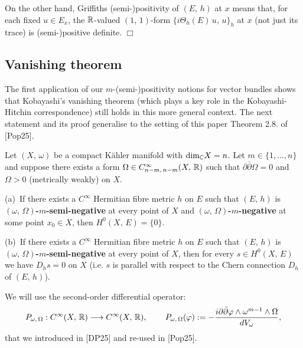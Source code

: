 \documentclass[12pt]{article}
\begin{document}
On the other hand, Griffiths (semi-)positivity of $(E,\,h)$ at $x$ means that, for each fixed $u\in E_x$, the $\mathbb{R}$-valued $(1,\,1)$-form $\{i\Theta_h(E)\,u,\,u\}_h$ at $x$ (not just its trace) is (semi-)positive definite.  \hfill $\Box$


\subsection{Vanishing theorem}\label{subsection:vanishing}

The first application of our $m$-(semi-)positivity notions for vector bundles shows that Kobayashi's vanishing theorem (which plays a key role in the Kobayashi-Hitchin correspondence) still holds in this more general context. The next statement and its proof generalise to the setting of this paper Theorem 2.8. of [Pop25].


\begin{The}\label{The:Kobayashi-vanishing_gen} Let $(X,\,\omega)$ be a compact K\"ahler manifold with $\mbox{dim}_{\mathbb{C}} X =n$. Let $m\in\{1,\dots , n\}$ and suppose there exists a form $\Omega\in C^\infty_{n-m,\,n-m}(X,\,\mathbb{R})$ such that $\partial\bar\partial\Omega = 0$ and $\Omega>0$ (metrically weakly) on $X$.

\vspace{1ex}  

(a)\, If there exists a $C^\infty$ Hermitian fibre metric $h$ on $E$ such that $(E,\,h)$ is {\bf $(\omega,\,\Omega)$-$m$-semi-negative} at every point of $X$ and {\bf $(\omega,\,\Omega)$-$m$-negative} at some point $x_0\in X$, then $H^0(X,\,E) = \{0\}$.

\vspace{1ex}  

(b)\, If there exists a $C^\infty$ Hermitian fibre metric $h$ on $E$ such that $(E,\,h)$ is {\bf $(\omega,\,\Omega)$-$m$-semi-negative} at every point of $X$,
then for every $s\in H^0(X,\,E)$ we have $D_h s=0$ on $X$ (i.e. $s$ is parallel with respect to the Chern connection $D_h$ of $(E,\,h)$).
  


\end{The}  


 We will use the second-order differential operator: \begin{eqnarray}\label{eqn:P_operator_def}P_{\omega,\,\Omega}:C^\infty(X,\,\mathbb{R})\longrightarrow C^\infty(X,\,\mathbb{R}), \hspace{5ex} P_{\omega,\,\Omega}(\varphi):=-\frac{i\partial\bar\partial\varphi\wedge\omega^{m-1}\wedge\Omega}{dV_\omega},\end{eqnarray} that we introduced in [DP25] and re-used in [Pop25]. 
\end{document}
